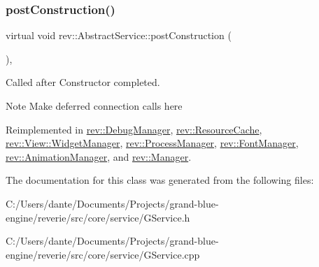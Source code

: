 \mbox{\label{classrev_1_1_abstract_service_a23dfd75f11839483f0f75b08b2b3d502}} 
\subsubsection{\texorpdfstring{postConstruction()}{postConstruction()}}
{\footnotesize\ttfamily virtual void rev\+::\+Abstract\+Service\+::post\+Construction (\begin{DoxyParamCaption}{ }\end{DoxyParamCaption})\hspace{0.3cm}{\ttfamily [inline]}, {\ttfamily [virtual]}}



Called after Constructor completed. 

\begin{DoxyNote}{Note}
Make deferred connection calls here 
\end{DoxyNote}


Reimplemented in \mbox{\hyperlink{classrev_1_1_debug_manager_a5fae9fc663600b490c2bb640c57d5019}{rev\+::\+Debug\+Manager}}, \mbox{\hyperlink{classrev_1_1_resource_cache_ae947d8b31bcf5d4fd78bc302f87bd2d2}{rev\+::\+Resource\+Cache}}, \mbox{\hyperlink{classrev_1_1_view_1_1_widget_manager_a0e3c8b58975856e332fd82a32dd37880}{rev\+::\+View\+::\+Widget\+Manager}}, \mbox{\hyperlink{classrev_1_1_process_manager_ae6f8b3b37aed5d3f0653578c269536ee}{rev\+::\+Process\+Manager}}, \mbox{\hyperlink{classrev_1_1_font_manager_a6e27e37302ff3aba4515db4dbde904db}{rev\+::\+Font\+Manager}}, \mbox{\hyperlink{classrev_1_1_animation_manager_a13f4d23b154d3ad28022bdcc6f681a58}{rev\+::\+Animation\+Manager}}, and \mbox{\hyperlink{classrev_1_1_manager_ace17f455b4762c5a6b16092b43a939b8}{rev\+::\+Manager}}.



The documentation for this class was generated from the following files\+:\begin{DoxyCompactItemize}
\item 
C\+:/\+Users/dante/\+Documents/\+Projects/grand-\/blue-\/engine/reverie/src/core/service/G\+Service.\+h\item 
C\+:/\+Users/dante/\+Documents/\+Projects/grand-\/blue-\/engine/reverie/src/core/service/G\+Service.\+cpp\end{DoxyCompactItemize}
